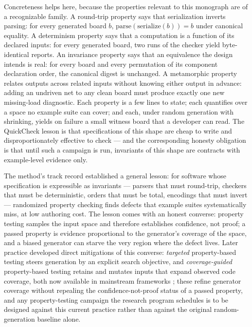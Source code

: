 Concreteness helps here, because the properties relevant to this
monograph are of a recognizable family. A round-trip property says that
serialization inverts parsing: for every generated board $b$,
$\mathrm{parse}(\mathrm{serialize}(b)) = b$ under canonical equality. A
determinism property says that a computation is a function of its
declared inputs: for every generated board, two runs of the checker
yield byte-identical reports. An invariance property says that an
equivalence the design intends is real: for every board and every
permutation of its component declaration order, the canonical digest is
unchanged. A metamorphic property relates outputs across related inputs
without knowing either output in advance: adding an undriven net to any
clean board must produce exactly one new missing-load diagnostic. Each
property is a few lines to state; each quantifies over a space no
example suite can cover; and each, under random generation with
shrinking, yields on failure a small witness board that a developer can
read. The QuickCheck lesson \cite{quickcheck} is that
specifications of this shape are cheap to write and disproportionately
effective to check --- and the corresponding honesty obligation is that
until such a campaign is run, invariants of this shape are contracts
with example-level evidence only.

The method's track record established a general lesson: for software
whose specification is expressible as invariants --- parsers that must
round-trip, checkers that must be deterministic, orders that must be
total, encodings that must invert --- randomized property checking finds
defects that example suites systematically miss, at low authoring cost.
The lesson comes with an honest converse: property testing samples the
input space and therefore establishes confidence, not proof; a passed
property is evidence proportional to the generator's coverage of the
space, and a biased generator can starve the very region where the
defect lives. Later practice developed direct mitigations of this
converse: \emph{targeted} property-based testing steers generation by an
explicit search objective, and \emph{coverage-guided} property-based
testing retains and mutates inputs that expand observed code coverage,
both now available in mainstream frameworks \cite{fuzzchick,hypothesis};
these refine generator coverage without repealing the confidence-not-proof
status of a passed property, and any property-testing campaign the
research program schedules is to be designed against this current practice
rather than against the original random-generation baseline alone.

